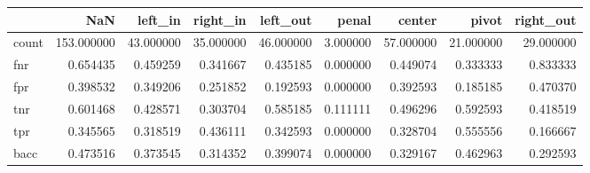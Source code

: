 \begin{tabular}{lrrrrrrrr}
\toprule
{} &         NaN &    left\_in &   right\_in &   left\_out &     penal &     center &      pivot &  right\_out \\
\midrule
count &  153.000000 &  43.000000 &  35.000000 &  46.000000 &  3.000000 &  57.000000 &  21.000000 &  29.000000 \\
fnr   &    0.654435 &   0.459259 &   0.341667 &   0.435185 &  0.000000 &   0.449074 &   0.333333 &   0.833333 \\
fpr   &    0.398532 &   0.349206 &   0.251852 &   0.192593 &  0.000000 &   0.392593 &   0.185185 &   0.470370 \\
tnr   &    0.601468 &   0.428571 &   0.303704 &   0.585185 &  0.111111 &   0.496296 &   0.592593 &   0.418519 \\
tpr   &    0.345565 &   0.318519 &   0.436111 &   0.342593 &  0.000000 &   0.328704 &   0.555556 &   0.166667 \\
bacc  &    0.473516 &   0.373545 &   0.314352 &   0.399074 &  0.000000 &   0.329167 &   0.462963 &   0.292593 \\
\bottomrule
\end{tabular}
